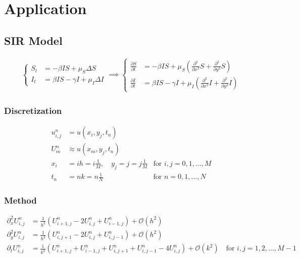 \section{Application}

\subsection{SIR Model}
\begin{align}
  \begin{cases}
    S_t & = -\beta IS + \mu_S \Delta S           \\
    I_t & = \beta IS - \gamma I + \mu_I \Delta I
  \end{cases}
  \implies
  \begin{cases}
    \frac{\partial S}{\partial t} & = -\beta IS + \mu_S\left(\frac{\partial^2 }{\partial x^2}S + \frac{\partial^2 }{\partial y^2} S \right)            \\
    \frac{\partial I}{\partial t} & = \beta IS - \gamma I + \mu_I \left(\frac{\partial^2 }{\partial x^2}I  + \frac{\partial^2 }{\partial y^2} I\right)
  \end{cases}
\end{align}

\subsubsection{Discretization}

\begin{align*}
  u_{i,j}^n & = u(x_i,y_j,t_n) \tag{exact}                                                       \\
  U_m^n     & \approx u(x_m,y_j,t_n) \tag{approx}                                                \\
  x_i       & = ih = i\frac{1}{M}, \quad y_j = j = j\frac{1}{M} & \text{for } i,j = 0,1,\ldots,M \\
  t_n       & = nk = n\frac{1}{N}                               & \text{for } n = 0,1,\ldots,N
\end{align*}

\subsubsection{Method}
\begin{align*}
  \partial_x^2 U_{i,j}^n & = \frac{1}{h^2} \left(U_{i+1,j}^n - 2U_{i,j}^n + U_{i-1,j}^n \right) + \mathcal{O}(h^2)                                                                   \\
  \partial_y^2 U_{i,j}^n & = \frac{1}{h^2} \left(U_{i,j+1}^n - 2U_{i,j}^n + U_{i,j-1}^n\right) + \mathcal{O}(h^2)                                                                    \\
  \partial_t U_{i,j}^n   & = \frac{1}{k^2} \left(U_{i+1,j}^n + U_{i-1,j}^n + U_{i,j+1}^n + U_{i,j-1}^n - 4U_{i,j}^n\right) + \mathcal{O}(k^2) \quad \text{for } i,j = 1,2,\ldots,M-1
\end{align*}

